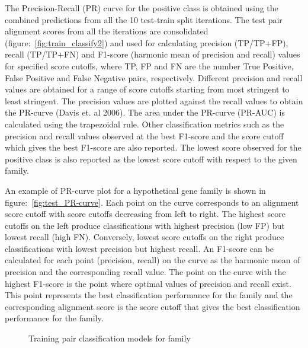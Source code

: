 \documentclass{article}
\begin{document}
			The Precision-Recall (PR) curve for the positive class is obtained using the combined predictions from all the 10 test-train split iterations. The test pair alignment scores from all the iterations are consolidated (figure:~\ref{fig:train_classify2}) and used for calculating precision (TP/TP+FP), recall (TP/TP+FN) and F1-score (harmonic mean of precision and recall) values for specified score cutoffs, where TP, FP and FN are the number True Positive, False Positive and False Negative pairs, respectively. Different precision and recall values are obtained for a range of score cutoffs starting from most stringent to least stringent. The precision values are plotted against the recall values to obtain the PR-curve (Davis et. al 2006). The area under the PR-curve (PR-AUC) is calculated using the trapezoidal rule. Other classification metrics such as the precision and recall values observed at the best F1-score and the score cutoff which gives the best F1-score are also reported. The lowest score observed for the positive class is also reported as the lowest score cutoff with respect to the given family. 
			
			An example of PR-curve plot for a hypothetical gene family is shown in figure:~\ref{fig:test_PR-curve}. Each point on the curve corresponds to an alignment score cutoff with score cutoffs decreasing from left to right. The highest score cutoffs on the left produce classifications with highest precision (low FP) but lowest recall (high FN). Conversely, lowest score cutoffs on the right produce classifications with lowest precision but highest recall. An F1-score can be calculated for each point (precision, recall) on the curve as the harmonic mean of precision and the corresponding recall value. The point on the curve with the highest F1-score is the point where optimal values of precision and recall exist. This point represents the best classification performance for the family and the corresponding alignment score is the score cutoff that gives the best classification performance for the family.
			
			\begin{figure}
				\caption{Training pair classification models for family}
				\label{fig:train_classify1}
			\end{figure}
			
\end{document}
